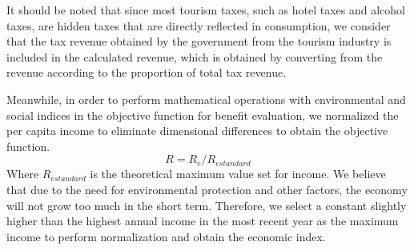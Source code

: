 \documentclass[12pt]{article}  %
\begin{document}
It should be noted that since most tourism taxes, such as hotel taxes and alcohol taxes, are hidden taxes that are directly reflected in consumption, we consider that the tax revenue obtained by the government from the tourism industry is included in the calculated revenue, which is obtained by converting from the revenue according to the proportion of total tax revenue.

Meanwhile, in order to perform mathematical operations with environmental and social indices in the objective function for benefit evaluation, we normalized the per capita income to eliminate dimensional differences to obtain the objective function.
\begin{equation}
    R = R_{e}/R_{estandard}
\end{equation}
Where $R_{estandard}$ is the theoretical maximum value set for income. We believe that due to the need for environmental protection and other factors, the economy will not grow too much in the short term. Therefore, we select a constant slightly higher than the highest annual income in the most recent year as the maximum income to perform normalization and obtain the economic index.
\end{document}
